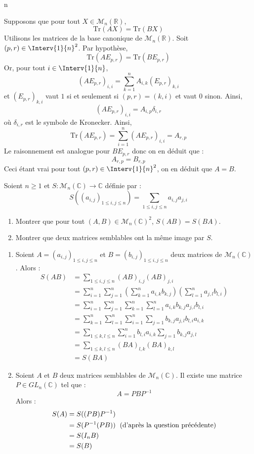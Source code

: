 n\documentclass[a4paper,10pt]{report}
\begin{document}
\corr Supposons que pour tout $X \in \mathcal{M}_n(\mathbb{R})$, 
$$\textrm{Tr}(AX)= \textrm{Tr}(BX)$$
Utilisons les matrices de la base canonique de $\mathcal{M}_n(\mathbb{R})$. Soit $(p,r) \in \Interv{1}{n}^2$. Par hypothèse,
$$ \textrm{Tr}(AE_{p,r})= \textrm{Tr}(BE_{p,r})$$
Or, pour tout $i \in \Interv{1}{n}$,
$$ (A E_{p,r})_{i,i} = \sum_{k=1}^n A_{i,k} (E_{p,r})_{k,i} $$
et $(E_{p,r})_{k,i}$ vaut $1$ si et seulement si $(p,r)=(k,i)$ et vaut $0$ sinon. Ainsi,
$$ (A E_{p,r})_{i,i} = A_{i,p} \delta_{i,r}$$
où $\delta_{i,r}$ est le symbole de Kronecker. Ainsi,
 $$ \textrm{Tr}(AE_{p,r}) = \sum_{i=1}^n (A E_{p,r})_{i,i} = A_{r,p}$$
 Le raisonnement est analogue pour $B E_{p,r}$ donc on en déduit que :
 $$ A_{r,p}= B_{r,p}$$
 Ceci étant vrai pour tout $(p,r) \in \Interv{1}{n}^2$, on en déduit que $A=B$.

\begin{Exercice}{} Soient $n \geq 1$ et $S : \mathcal{M}_n(\mathbb{C}) \rightarrow \mathbb{C}$ définie par :
$$ S((a_{i,j})_{1 \leq i,j \leq n}) = \sum_{1 \leq i,j \leq n} a_{i,j} a_{j,i}$$

\begin{enumerate}
\item Montrer que pour tout $(A,B) \in \mathcal{M}_n(\mathbb{C})^2$, $S(AB)=S(BA)$.
\item Montrer que deux matrices semblables ont la même image par $S$.
\end{enumerate}
\end{Exercice}

\corr 

\begin{enumerate}
\item Soient $A=(a_{i,j})_{1 \leq i,j \leq n}$ et $B= (b_{i,j})_{1 \leq i,j \leq n}$  deux matrices de $\mathcal{M}_n(\mathbb{C})$. Alors :
\begin{align*}
S(AB) & =  \sum_{1 \leq i,j \leq n} (AB)_{i,j} (AB)_{j,i} \\
& = \sum_{i=1}^n \sum_{j=1}^n \left( \sum_{k=1}^n a_{i,k} b_{k,j} \right) \left( \sum_{l=1}^n a_{j,l} b_{l,i} \right) \\
& =  \sum_{i=1}^n \sum_{j=1}^n \sum_{k=1}^n \sum_{l=1}^n a_{i,k} b_{k,j} a_{j,l} b_{l,i} \\
& = \sum_{k=1}^n \sum_{l=1}^n \sum_{i=1}^n \sum_{j=1} b_{k,j} a_{j,l} b_{l,i} a_{i,k} \\
& = \sum_{1 \leq k,l \leq n} \sum_{i=1}^n  b_{l,i} a_{i,k}  \sum_{j=1} b_{k,j} a_{j,l} \\
& = \sum_{1 \leq k,l \leq n} (BA)_{l,k} (BA)_{k,l} \\
& = S(BA) 
\end{align*}
\item Soient $A$ et $B$ deux matrices semblables de $\mathcal{M}_n(\mathbb{C})$. Il existe une matrice $P \in GL_n(\mathbb{C})$ tel que :
$$ A=PBP^{-1}$$
Alors :
\begin{align*}
S(A) & = S((PB)P^{-1}) \\
& = S(P^{-1} (PB)) \; \hbox{ (d'après la question précédente)} \\
& = S(I_n B) \\
& = S(B)
\end{align*}
\end{enumerate}
\end{document}

